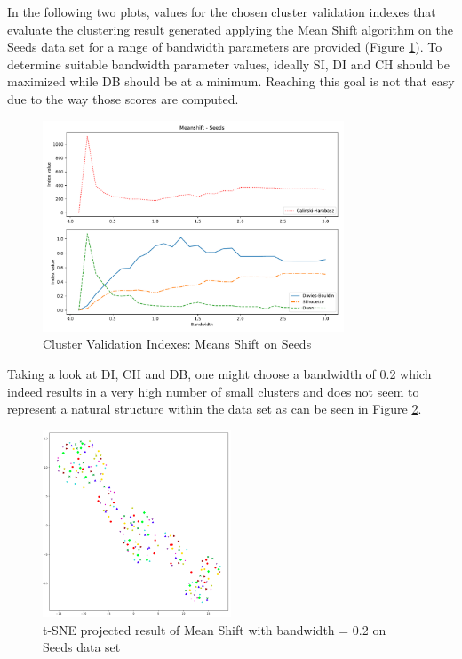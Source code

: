 In the following two plots, values for the chosen cluster validation indexes that evaluate the clustering result generated applying the Mean Shift algorithm on the Seeds data set for a range of bandwidth parameters are provided (Figure \ref{fig:mean_shift_seeds_indexes}).
To determine suitable bandwidth parameter values, ideally \gls{SI}, \gls{DI} and \gls{CH} should be maximized while \gls{DB} should be at a minimum. 
Reaching this goal is not that easy due to the way those scores are computed.
\newline
\begin{figure}[H]
\begin{center}
\includegraphics[width=0.8\textwidth]{images/Meanshift_-_Seeds.pdf}
\end{center}
\caption{Cluster Validation Indexes: Means Shift on Seeds}
\label{fig:mean_shift_seeds_indexes}
\end{figure}
Taking a look at \gls{DI}, \gls{CH} and \gls{DB}, one might choose a bandwidth of 0.2 which indeed results in a very high number of small clusters and does not seem to represent a natural structure within the data set as can be seen in Figure \ref{fig:meanshift_seeds_clustering_tsne}.
\begin{figure}[H]
    \centering
    \includegraphics[width=0.5\textwidth]{images/Meanshift_Seeds_0_2.png}
    \caption{t-SNE projected result of Mean Shift with bandwidth = 0.2 on Seeds data set}
    \label{fig:meanshift_seeds_clustering_tsne}
\end{figure}


